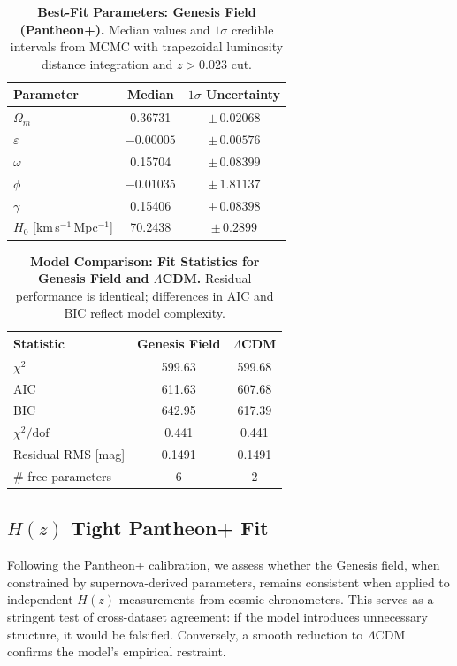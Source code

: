 \begin{table}[htpb]
\centering
\caption{\textbf{Best-Fit Parameters: Genesis Field (Pantheon+).} Median values and $1\sigma$ credible intervals from MCMC with trapezoidal luminosity distance integration and $z > 0.023$ cut.}
\vspace{0.5em}
\begin{tabular}{lcc}
\hline
Parameter & Median & $1\sigma$ Uncertainty \\
\hline
$\Omega_m$       & 0.36731 & $\pm\,0.02068$ \\
$\varepsilon$    & $-0.00005$ & $\pm\,0.00576$ \\
$\omega$         & 0.15704 & $\pm\,0.08399$ \\
$\phi$           & $-0.01035$ & $\pm\,1.81137$ \\
$\gamma$         & 0.15406 & $\pm\,0.08398$ \\
$H_0$ [km\,s$^{-1}$\,Mpc$^{-1}$] & 70.2438 & $\pm\,0.2899$ \\
\hline
\end{tabular}
\label{tab:pantheon_params}
\end{table}

\begin{table}[htpb]
\centering
\caption{\textbf{Model Comparison: Fit Statistics for Genesis Field and $\Lambda$CDM.} Residual performance is identical; differences in AIC and BIC reflect model complexity.}
\vspace{0.5em}
\begin{tabular}{lcc}
\hline
Statistic & Genesis Field & $\Lambda$CDM \\
\hline
$\chi^2$ & 599.63 & 599.68 \\
AIC & 611.63 & 607.68 \\
BIC & 642.95 & 617.39 \\
$\chi^2/\mathrm{dof}$ & 0.441 & 0.441 \\
Residual RMS [mag] & 0.1491 & 0.1491 \\
\# free parameters & 6 & 2 \\
\hline
\end{tabular}
\label{tab:pantheon_stats}
\end{table}

\subsection{\texorpdfstring{$H(z)$}{Hz} Tight Pantheon+ Fit}
\label{sec:hz_tight}

Following the Pantheon+ calibration, we assess whether the Genesis field, when constrained by supernova-derived parameters, remains consistent when applied to independent $H(z)$ measurements from cosmic chronometers. This serves as a stringent test of cross-dataset agreement: if the model introduces unnecessary structure, it would be falsified. Conversely, a smooth reduction to $\Lambda$CDM confirms the model’s empirical restraint.

